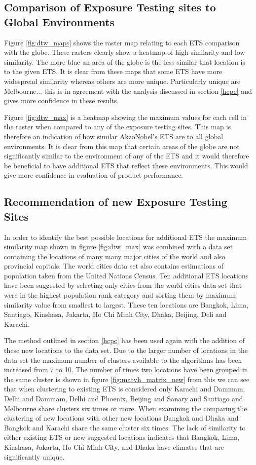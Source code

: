 \documentclass{article}
\begin{document}
\subsection{Comparison of Exposure Testing sites to Global Environments}
Figure \ref{fig:dtw_maps} shows the raster map relating to each ETS comparison with the globe. These rasters clearly show a heatmap of high similarity and low similarity. The more blue an area of the globe is the less similar that location is to the given ETS. It is clear from these maps that some ETS have more widespread similarity whereas others are more unique. Particularly unique are Melbourne... this is in agreement with the analysis discussed in section \ref{hcpc} and gives more confidence in these results. 

Figure \ref{fig:dtw_max} is a heatmap showing the maximum values for each cell in the raster when compared to any of the exposure testing sites. This map is therefore an indication of how similar AkzoNobel's ETS are to all global environments. It is clear from this map that certain areas of the globe are not significantly similar to the environment of any of the ETS and it would therefore be beneficial to have additional ETS that reflect these environments. This would give more confidence in evaluation of product performance.  
\subsection{Recommendation of new Exposure Testing Sites}

In order to identify the best possible locations for additional ETS the maximum similarity map shown in figure \ref{fig:dtw_max} was combined with a data set containing the locations of many many major cities of the world and also provincial capitals. The world cities data set also contains estimations of population taken from the United Nations Census. Ten additional ETS locations have been suggested by selecting only cities from the world cities data set that were in the highest population rank category and sorting  them by maximum similarity value from smallest to largest. These ten locations are Bangkok, Lima, Santiago, Kinshasa, Jakarta, Ho Chi Minh City, Dhaka, Beijing, Deli and Karachi. 

The method outlined in section \ref{hcpc} has been used again with the addition of these new locations to the data set. Due to the larger number of locations in the data set the maximum number of clusters available to the algorithms has been increased from 7 to 10. The number of times two locations have been grouped in the same cluster is shown in figure \ref{fig:matvh_matrix_new} from this we can see that when clustering to existing ETS is considered only Karachi and Dammam, Delhi and Dammam, Delhi and Phoenix, Beijing and Sanary and Santiago and Melbourne share clusters six times or more. When examining the comparing the clustering of new locations with other new locations Bangkok and Dhaka and Bangkok and Karachi share the same cluster six times. The lack of similarity to either existing ETS or new suggested locations indicates that Bangkok, Lima, Kinshasa, Jakarta, Ho Chi Minh City, and Dhaka have climates that are significantly unique. 
\end{document}

